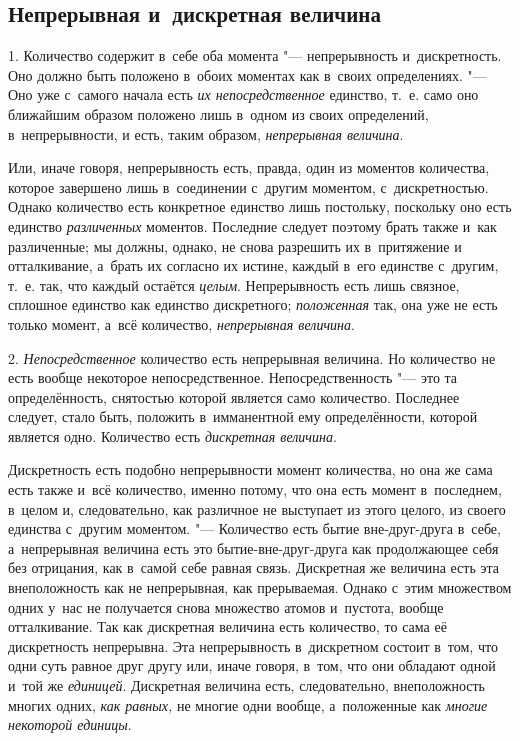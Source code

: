 \subsection{Непрерывная и~дискретная величина}

1. Количество содержит в~себе оба момента "--- непрерывность и~дискретность.
Оно должно быть положено в~обоих моментах как в~своих определениях. "--- Оно
уже с~самого начала есть {\em их непосредственное} единство, т.~е. само оно
ближайшим образом положено лишь в~одном из своих определений, в~непрерывности,
и есть, таким образом, {\em непрерывная величина}.

Или, иначе говоря, непрерывность есть, правда, один из моментов количества,
которое завершено лишь в~соединении с~другим моментом, с~дискретностью. Однако
количество есть конкретное единство лишь постольку, поскольку оно есть единство
{\em различенных} моментов. Последние следует поэтому брать также и~как
различенные; мы должны, однако, не снова разрешить их в~притяжение и
отталкивание, а~брать их согласно их истине, каждый в~его единстве с~другим,
т.~е. так, что каждый остаётся {\em целым}. Непрерывность есть лишь связное,
сплошное единство как единство дискретного; {\em положенная} так, она уже не
есть только момент, а~всё количество, {\em непрерывная величина}.

2. {\em Непосредственное} количество есть непрерывная величина. Но количество
не есть вообще некоторое непосредственное. Непосредственность "--- это та
определённость, снятостью которой является само количество. Последнее следует,
стало быть, положить в~имманентной ему определённости, которой является одно.
Количество есть {\em дискретная величина}.

Дискретность есть подобно непрерывности момент количества, но она же сама есть
также и~всё количество, именно потому, что она есть момент в~последнем, в~целом
и, следовательно, как различное не выступает из этого целого, из своего
единства с~другим моментом. "--- Количество есть бытие вне-друг-друга в~себе,
а~непрерывная величина есть это бытие-вне-друг-друга как продолжающее себя без
отрицания, как в~самой себе равная связь. Дискретная же величина есть эта
внеположность как не непрерывная, как прерываемая. Однако с~этим множеством
одних у~нас не получается снова множество атомов и~пустота, вообще
отталкивание. Так как дискретная величина есть количество, то сама её
дискретность непрерывна. Эта непрерывность в~дискретном состоит в~том, что одни
суть равное друг другу или, иначе говоря, в~том, что они обладают одной и~той
же {\em единицей}. Дискретная величина есть, следовательно, внеположность
многих одних, {\em как равных,} не многие одни вообще, а~положенные как
{\em многие некоторой единицы}.

